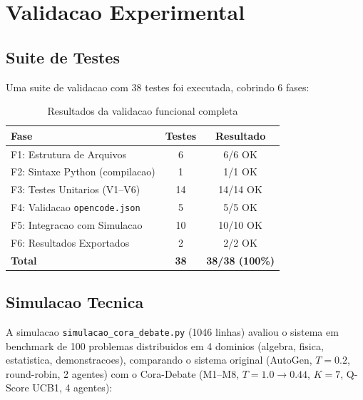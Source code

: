 \documentclass[5p]{elsarticle}
\begin{document}
\section{Validacao Experimental}

\subsection{Suite de Testes}

Uma suite de validacao com 38 testes foi executada, cobrindo 6 fases:

\begin{table}[H]
\centering
\begin{tabular}{lcc}
\toprule
\textbf{Fase} & \textbf{Testes} & \textbf{Resultado} \\
\midrule
F1: Estrutura de Arquivos & 6 & 6/6 OK \\
F2: Sintaxe Python (compilacao) & 1 & 1/1 OK \\
F3: Testes Unitarios (V1--V6) & 14 & 14/14 OK \\
F4: Validacao \texttt{opencode.json} & 5 & 5/5 OK \\
F5: Integracao com Simulacao & 10 & 10/10 OK \\
F6: Resultados Exportados & 2 & 2/2 OK \\
\midrule
\textbf{Total} & \textbf{38} & \textbf{38/38 (100\%)} \\
\bottomrule
\end{tabular}
\caption{Resultados da validacao funcional completa}
\end{table}

\subsection{Simulacao Tecnica}

A simulacao \texttt{simulacao\_cora\_debate.py} (1046 linhas) avaliou o sistema em benchmark de 100 problemas distribuidos em 4 dominios (algebra, fisica, estatistica, demonstracoes), comparando o sistema original (AutoGen, $T=0.2$, round-robin, 2 agentes) com o Cora-Debate (M1--M8, $T=1.0\to0.44$, $K=7$, Q-Score UCB1, 4 agentes):
\end{document}
